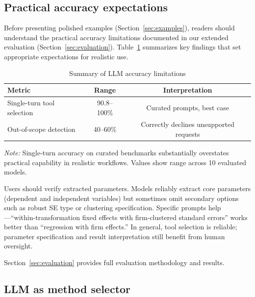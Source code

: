 \subsection{Practical accuracy expectations} \label{sec:accuracy-expectations}

Before presenting polished examples (Section~\ref{sec:examples}), readers
should understand the practical accuracy limitations documented in our
extended evaluation (Section~\ref{sec:evaluation}). Table~\ref{tab:accuracy-summary-early}
summarizes key findings that set appropriate expectations for realistic use.

\begin{table}[htbp]
\centering
\begin{threeparttable}
\caption{Summary of LLM accuracy limitations}
\label{tab:accuracy-summary-early}
\small
\begin{tabular}{lcc}
\toprule
Metric & Range & Interpretation \\
\midrule
Single-turn tool selection & 90.8--100\% & Curated prompts, best case \\
Out-of-scope detection & 40--60\% & Correctly declines unsupported requests \\
\bottomrule
\end{tabular}
\begin{tablenotes}\small
\item \emph{Note:} Single-turn accuracy on curated benchmarks substantially
overstates practical capability in realistic workflows. Values show range
across 10 evaluated models.
\end{tablenotes}
\end{threeparttable}
\end{table}

Users should verify extracted parameters. Models reliably extract core
parameters (dependent and independent variables) but sometimes omit secondary
options such as robust SE type or clustering specification.
Specific prompts help---``within-transformation fixed effects with
firm-clustered standard errors'' works better than ``regression with firm
effects.'' In general, tool selection is reliable; parameter specification
and result interpretation still benefit from human oversight.

\noindent Section~\ref{sec:evaluation} provides full evaluation methodology and results.

\subsection{LLM as method selector}


